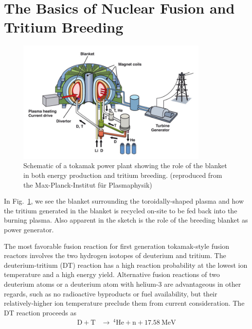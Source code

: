 \section{The Basics of Nuclear Fusion and Tritium Breeding}\label{sec:fusion-basics}

\begin{figure}
	\centering
	\includegraphics[width=0.85\textwidth]{chapters/figures/power-plant-schematic} 
	\caption{Schematic of a tokamak power plant showing the role of the blanket in both energy production and tritium breeding. (reproduced from the Max-Planck-Institut für Plasmaphysik)}
	\label{fig:power-plant-schematic}
\end{figure}

In Fig.~\ref{fig:power-plant-schematic}, we see the blanket surrounding the toroidally-shaped plasma and how the tritium generated in the blanket is recycled on-site to be fed back into the burning plasma. Also apparent in the sketch is the role of the breeding blanket as power generator. 


The most favorable fusion reaction for first generation tokamak-style fusion reactors involves the two hydrogen isotopes of deuterium and tritium. The deuterium-tritium (DT) reaction has a high reaction probability at the lowest ion temperature and a high energy yield. Alternative fusion reactions of two deuterium atoms or a deuterium atom with helium-3 are advantageous in other regards, such as no radioactive byproducts or fuel availability, but their relatively-higher ion temperature preclude them from current consideration.\cite{abdou} The DT reaction proceeds as
\begin{align}
	\mathrm{D} + \mathrm{T}&\xrightarrow{}\ ^4\mathrm{He}+\mathrm{n}+17.58\ \text{MeV} \label{eq:dt-reaction}
\end{align}

